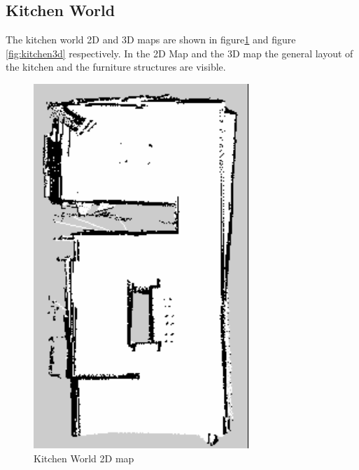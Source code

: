 \documentclass[10pt,journal,compsoc]{IEEEtran}
\begin{document}
\subsection{Kitchen World}
The kitchen world 2D and 3D maps are shown in figure\ref{fig:kitchen2d} and figure \ref{fig:kitchen3d} respectively. In the 2D Map and the 3D map the general layout of the kitchen and the furniture structures are visible. 

\begin{figure}[thpb]
      \centering
      \includegraphics[width=\linewidth]{images/kitchen2dmap}
      \caption{Kitchen World 2D map}
      \label{fig:kitchen2d}
\end{figure}
\end{document}
